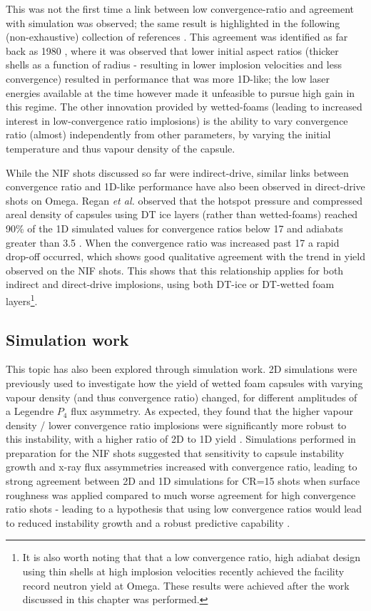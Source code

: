 This was not the first time a link between low convergence-ratio and agreement with simulation was observed; the same result is highlighted in the following (non-exhaustive) collection of references \cite{Kato1996, Nishimura2000, Meyerhofer2001, Li2002, Lindl2004, LePape2014, Khan2016, Haines2017a}. This agreement was identified as far back as 1980 \cite{Key1980}, where it was observed that lower initial aspect ratios (thicker shells as a function of radius - resulting in lower implosion velocities and less convergence) resulted in performance that was more 1D-like; the low laser energies available at the time however made it unfeasible to pursue high gain in this regime. The other innovation provided by wetted-foams (leading to increased interest in low-convergence ratio implosions) is the ability to vary convergence ratio (almost) independently from other parameters, by varying the initial temperature and thus vapour density of the capsule.

While the NIF shots discussed so far were indirect-drive, similar links between convergence ratio and 1D-like performance have also been observed in direct-drive shots on Omega. Regan \textit{et al.} observed that the hotspot pressure and compressed areal density of capsules using DT ice layers (rather than wetted-foams) reached 90\% of the 1D simulated values for convergence ratios below 17 and adiabats greater than 3.5 \cite{Regan2016}. When the convergence ratio was increased past 17 a rapid drop-off occurred, which shows good qualitative agreement with the trend in yield observed on the NIF shots. This shows that this relationship applies for both indirect and direct-drive implosions, using both DT-ice or DT-wetted foam layers\footnote{It is also worth noting that that a low convergence ratio, high adiabat design using thin shells at high implosion velocities \cite{Williams2021} recently achieved the facility record neutron yield at Omega. These results were achieved after the work discussed in this chapter was performed.}.


\subsection{Simulation work} 

This topic has also been explored through simulation work. 2D simulations were previously used to investigate how the yield of wetted foam capsules with varying vapour density (and thus convergence ratio) changed, for different amplitudes of a Legendre $P_4$ flux asymmetry. As expected, they found that the higher vapour density / lower convergence ratio implosions were significantly more robust to this instability, with a higher ratio of 2D to 1D yield \cite{Olson2013}. Simulations performed in preparation for the NIF shots suggested that sensitivity to capsule instability growth and x-ray flux assymmetries increased with convergence ratio, leading to strong agreement between 2D and 1D simulations for CR=15 shots when surface roughness was applied compared to much worse agreement for high convergence ratio shots - leading to a hypothesis that using low convergence ratios would lead to reduced instability growth and a robust predictive capability \cite{Olson2016a}. 

